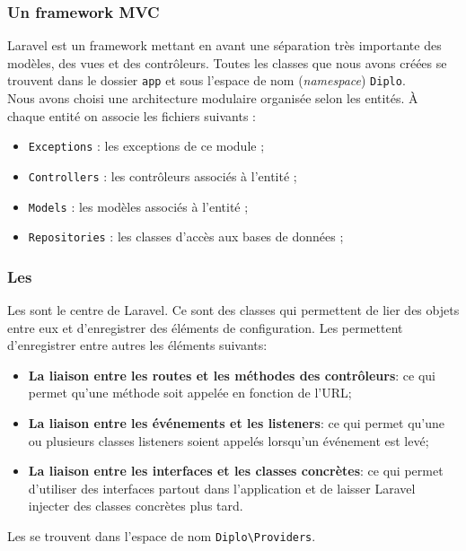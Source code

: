 		\subsubsection{Un framework MVC}
			Laravel est un framework mettant en avant une séparation très importante des modèles, des vues et des contrôleurs. Toutes les classes que nous avons créées se trouvent dans le dossier \verb|app| et sous l'espace de nom (\textit{namespace}) \verb|Diplo|.\\

			Nous avons choisi une architecture modulaire organisée selon les entités. À chaque entité on associe les fichiers suivants :
			\begin{itemize}
				\item \verb|Exceptions| : les exceptions de ce module ;
				\item \verb|Controllers| : les contrôleurs associés à l'entité ;
				\item \verb|Models| : les modèles associés à l'entité ;
				\item \verb|Repositories| : les classes d'accès aux bases de données ;
			\end{itemize}

		\subsubsection{Les \servicesProvider{}}
			Les \servicesProvider{} sont le centre de Laravel. Ce sont des classes qui permettent de lier des objets entre eux et d'enregistrer des éléments de configuration. Les \servicesProvider{} permettent d'enregistrer entre autres les éléments suivants:
			\begin{itemize}
				\item \textbf{La liaison entre les routes et les méthodes des contrôleurs}: ce qui permet qu'une méthode soit appelée en fonction de l'URL;
				\item \textbf{La liaison entre les événements et les listeners}: ce qui permet qu'une ou plusieurs classes listeners soient appelés lorsqu'un événement est levé;
				\item \textbf{La liaison entre les interfaces et les classes concrètes}: ce qui permet d'utiliser des interfaces partout dans l'application et de laisser Laravel injecter des classes concrètes plus tard.
			\end{itemize}\bigskip

			Les \servicesProvider{} se trouvent dans l'espace de nom \verb|Diplo\Providers|.


